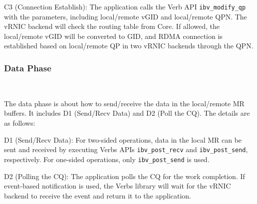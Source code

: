 C3 (Connection Establish): The application calls the Verb API \texttt{ibv\_modify\_qp} with the parameters, including local/remote vGID and local/remote QPN. The vRNIC backend will check the routing table from \sys Core. If allowed, the local/remote vGID will be converted to GID, and RDMA connection is established based on local/remote QP in two vRNIC backends through the QPN.

\subsubsection{\textbf{Data Phase}}
\
\noindent

The data phase is about how to send/receive the data in the local/remote MR buffers. It includes D1 (Send/Recv Data) and D2 (Poll the CQ). The details are as follows:


D1 (Send/Recv Data): For two-sided operations, data in the local MR can be sent and received by executing Verbs APIs \texttt{ibv\_post\_recv} and \texttt{ibv\_post\_send}, respectively. For one-sided operations, only \texttt{ibv\_post\_send} is used.


D2 (Polling the CQ): The application polls the CQ for the work completion. If event-based notification is used, the Verbs library will wait for the vRNIC backend to receive the event and return it to the application.
